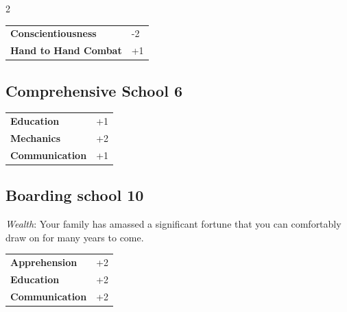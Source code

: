 \begin{multicols}{2}
\begin{tcolorbox}
\begin{tabular}{@{}ll@{}}
    \textbf{Conscientiousness} & -2\\
    \textbf{Hand to Hand Combat} & +1\\
\end{tabular}


\end{tcolorbox}

\begin{tcolorbox}
    \subsection*{Comprehensive School \hfill \small{6 }}
    \tcblower




\begin{tabular}{@{}ll@{}}
    \textbf{Education} & +1\\
    \textbf{Mechanics} & +2\\
    \textbf{Communication} & +1\\
\end{tabular}


\end{tcolorbox}

\begin{tcolorbox}
    \subsection*{Boarding school \hfill \small{10 }}
    \tcblower
\textit{Wealth}: Your family has amassed a significant fortune that you can comfortably draw on for many years to come.


\vspace{3mm}

\begin{tabular}{@{}ll@{}}
    \textbf{Apprehension} & +2\\
    \textbf{Education} & +2\\
    \textbf{Communication} & +2\\
\end{tabular}


\end{tcolorbox}
\end{multicols}
